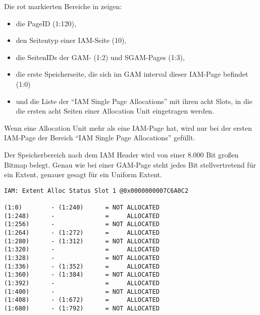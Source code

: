         Die rot markierten Bereiche in  zeigen:
        \begin{itemize}
          \item die PageID (1:120),
          \item den Seitentyp einer IAM-Seite (10),
          \item die SeitenIDs der GAM- (1:2) und SGAM-Pages (1:3),
          \item die erste Speicherseite, die sich im GAM interval dieser
          IAM-Page befindet (1:0)
          \item und die Liste der \enquote{IAM Single Page Allocations} mit
          ihren acht Slots, in die die ersten acht Seiten einer Allocation Unit
          eingetragen werden.
        \end{itemize}
        \begin{merke}
          Wenn eine Allocation Unit mehr als eine IAM-Page hat, wird nur bei der
          ersten IAM-Page der Bereich \enquote{IAM Single Page Allocations}
          gefüllt.
        \end{merke}
        Der Speicherbereich nach dem IAM Header wird von einer 8.000 Bit großen
        Bitmap belegt. Genau wie bei einer GAM-Page steht jedes Bit
        stellvertretend für ein Extent, genauer gesagt für ein Uniform Extent.
        \begin{lstlisting}[language=terminal,caption={Die Extent Allocation
        Status Slots einer IAM-Page}, label=admin05_02]
IAM: Extent Alloc Status Slot 1 @0x0000000007C6A0C2

(1:0)        - (1:240)      = NOT ALLOCATED                              
(1:248)      -              =     ALLOCATED                              
(1:256)      -              = NOT ALLOCATED                              
(1:264)      - (1:272)      =     ALLOCATED                              
(1:280)      - (1:312)      = NOT ALLOCATED                              
(1:320)      -              =     ALLOCATED                              
(1:328)      -              = NOT ALLOCATED                              
(1:336)      - (1:352)      =     ALLOCATED                              
(1:360)      - (1:384)      = NOT ALLOCATED                              
(1:392)      -              =     ALLOCATED                              
(1:400)      -              = NOT ALLOCATED                              
(1:408)      - (1:672)      =     ALLOCATED                              
(1:680)      - (1:792)      = NOT ALLOCATED                              
        
        \end{lstlisting}
